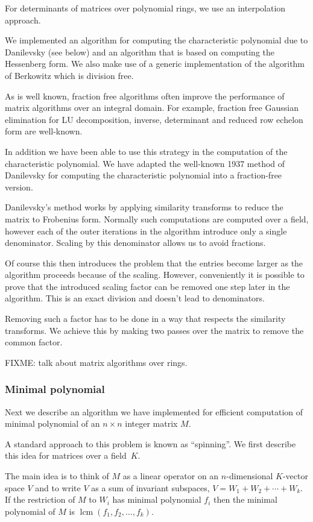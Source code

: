 \documentclass{sig-alternate-05-2015}
\DeclareMathOperator{\lcm}{lcm}
\begin{document}
For determinants of matrices over polynomial rings, we use an interpolation approach.

We implemented an algorithm for computing the characteristic polynomial due to
Danilevsky (see below) and an algorithm that is based on computing the Hessenberg
form. We also make use of a generic implementation of the algorithm of Berkowitz which
is division free. 

As is well known, fraction free algorithms often improve the performance of matrix
algorithms over an integral domain. For example, fraction free Gaussian elimination
for LU decomposition, inverse, determinant and reduced row echelon form
are well-known.

In addition we have been able to use this strategy in the computation
of the characteristic polynomial. We have adapted the well-known 1937 method
of Danilevsky for computing the characteristic polynomial into a fraction-free
version.

Danilevsky's method works by applying similarity transforms to reduce the
matrix to Frobenius form. Normally such computations are computed over a
field, however each of the outer iterations in the algorithm introduce only
a single denominator. Scaling by this denominator allows us to avoid
fractions.

Of course this then introduces the problem that the entries become larger
as the algorithm proceeds because of the scaling. However, conveniently
it is possible to prove that the introduced scaling factor can be removed 
one step later in the algorithm. This is an exact division and doesn't
lead to denominators.

Removing such a factor has to be done in a way that respects the
similarity transforms. We achieve this by making two passes over the matrix
to remove the common factor.

FIXME: talk about matrix algorithms over rings.

\subsubsection{Minimal polynomial}

Next we describe an algorithm we have implemented for efficient
computation of minimal polynomial of an $n\times n$ integer matrix $M$.

A standard approach to this problem is known as ``spinning''. 
We first describe this idea for matrices over a field~$K$.

The main idea is to think of $M$ as a linear operator on an $n$-dimensional
$K$-vector space $V$ and to write $V$ as a sum of invariant subspaces, 
$V = W_1 + W_2 + \cdots + W_k$. If the restriction of $M$ to $W_i$ has
minimal polynomial $f_i$ then the minimal polynomial of $M$ is
$\lcm(f_1, f_2, \ldots, f_k)$.
\end{document}
